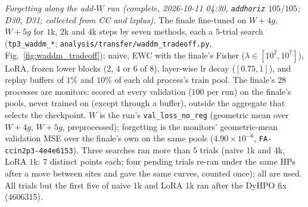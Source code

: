 \documentclass[11pt]{article}
\newcommand{\code}[1]{\texttt{#1}}
\begin{document}
\emph{Forgetting along the add-$W$ run (complete, 2026-10-11 04:30, \code{addhoriz} $105/105$; D30, D31; collected from CC and
lxplus).} The finale fine-tuned on $W+4g$, $W+5g$ for $1$k, $2$k and $4$k steps by seven methods, each a $5$-trial search
(\code{tp3\_waddm\_*}; \code{analysis/transfer/waddm\_tradeoff.py}, Fig.~\ref{fig:waddm_tradeoff}): naive, EWC with the
finale's Fisher ($\lambda\in[10^2,10^7]$), LoRA, frozen lower blocks ($2$, $4$ or $6$ of $8$), layer-wise lr decay
($[0.75,1]$), and replay buffers of $1\%$ and $10\%$ of each old process's train pool. The finale's $28$ processes are
monitors: scored at every validation ($100$ per run) on the finale's pools, never trained on (except through a buffer),
outside the aggregate that selects the checkpoint. $W$ is the run's \code{val\_loss\_no\_reg} (geometric mean over
$W+4g$, $W+5g$, preprocessed); forgetting is the monitors' geometric-mean validation MSE over the finale's own on the same
pools ($4.90\times10^{-6}$, \code{FA-ccin2p3-4e4e6153}). Three searches ran more than $5$ trials (naive $1$k and $4$k, LoRA $1$k: $7$ distinct
points each; four pending trials re-ran under the same HPs after a move between sites and gave the same curves, counted
once); all are used. All trials but the first five of naive $1$k and LoRA $1$k ran after the DyHPO fix (4606315).
\end{document}
